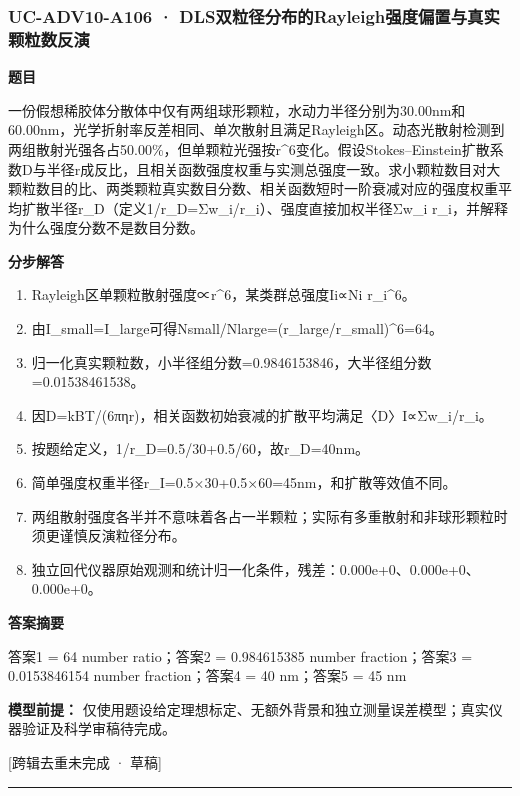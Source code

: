 \documentclass[UTF8,11pt,a4paper]{ctexart}
\begin{document}
\subsubsection*{UC-ADV10-A106 · DLS双粒径分布的Rayleigh强度偏置与真实颗粒数反演}
\noindent\textbf{题目}\par
一份假想稀胶体分散体中仅有两组球形颗粒，水动力半径分别为30.00nm和60.00nm，光学折射率反差相同、单次散射且满足Rayleigh区。动态光散射检测到两组散射光强各占50.00\%，但单颗粒光强按r\textasciicircum{}6变化。假设Stokes–Einstein扩散系数D与半径r成反比，且相关函数强度权重与实测总强度一致。求小颗粒数目对大颗粒数目的比、两类颗粒真实数目分数、相关函数短时一阶衰减对应的强度权重平均扩散半径r\_D（定义1/r\_D=Σw\_i/r\_i）、强度直接加权半径Σw\_i r\_i，并解释为什么强度分数不是数目分数。\par
\medskip\noindent\textbf{分步解答}
\begin{enumerate}
\item Rayleigh区单颗粒散射强度∝r\textasciicircum{}6，某类群总强度Ii∝Ni r\_i\textasciicircum{}6。
\item 由I\_small=I\_large可得Nsmall/Nlarge=(r\_large/r\_small)\textasciicircum{}6=64。
\item 归一化真实颗粒数，小半径组分数=0.9846153846，大半径组分数=0.01538461538。
\item 因D=kBT/(6πηr)，相关函数初始衰减的扩散平均满足〈D〉I∝Σw\_i/r\_i。
\item 按题给定义，1/r\_D=0.5/30+0.5/60，故r\_D=40nm。
\item 简单强度权重半径r\_I=0.5×30+0.5×60=45nm，和扩散等效值不同。
\item 两组散射强度各半并不意味着各占一半颗粒；实际有多重散射和非球形颗粒时须更谨慎反演粒径分布。
\item 独立回代仪器原始观测和统计归一化条件，残差：0.000e+0、0.000e+0、0.000e+0。
\end{enumerate}
\noindent\textbf{答案摘要}\par
答案1 = 64 number ratio；答案2 = 0.984615385 number fraction；答案3 = 0.0153846154 number fraction；答案4 = 40 nm；答案5 = 45 nm\par
\noindent\textbf{模型前提：}
仅使用题设给定理想标定、无额外背景和独立测量误差模型；真实仪器验证及科学审稿待完成。\par
\noindent\textcolor{red!65!black}{[跨辑去重未完成 · 草稿]} \par
\medskip\hrule\medskip
{}
\end{document}
